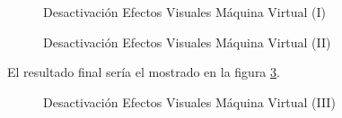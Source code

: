 \documentclass{scrartcl}
\begin{document}
\begin{figure}[H]
	
	\centering
	\caption{Desactivación Efectos Visuales Máquina Virtual (I)}
	\label{fig:ConfVM04}
	
\end{figure}

\begin{figure}[H]
	
	\centering
	\caption{Desactivación Efectos Visuales Máquina Virtual (II)}
	\label{fig:ConfVM05}
	
\end{figure}

El resultado final sería el mostrado en la figura \ref{fig:ConfVM06}.
\begin{figure}[H]
	
	\centering
	\caption{Desactivación Efectos Visuales Máquina Virtual (III)}
	\label{fig:ConfVM06}
	
\end{figure}
\end{document}
